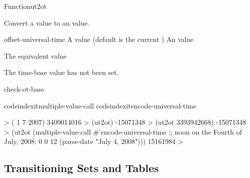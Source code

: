 \documentclass[10pt,twoside,english,pdftex]{article}
\begin{document}
\begin{functiondoc}{Function}{ut2ot}{%
    }
%

\fnsyntax

\fnpurpose Convert a  value to an  value.

\fnpackage {}

\fnmodule {}

\fnargs
\begin{args}{offset-universal-time}
 A  value (default is the current
   )
 An  value
\end{args}

\fnreturns The equivalent  value

\fnerrors The  time-base value has not been set.

\begin{alsos}{check-ot-base}
\also[*ot-base*]
\also[ot2ut]
\end{alsos}

\fnexamples
%
codeindexit{multiple-value-call}%
codeindexit{encode-universal-time}%
%
\W\supp
\begin{example}
  > ( 1 7 2007)
  3409014016
  > (ut2ot)
  -15071348
  > (ut2ot 3393942668)
  -15071348
  > (ut2ot (multiple-value-call #'encode-universal-time 
             ;; noon on the Fourth of July, 2008:
             0 0 12 (parse-date "July 4, 2008")))
  15161984
  >
\end{example}

\end{functiondoc}


\T\markright{}%
\T\pagestyle{plain}
\T\clearpage
\W{}
\T\pagestyle{fancy}
\T\thispagestyle{fancybottom}
\T\global\def\fnlastname{ }%

\subsection{Transitioning Sets and Tables}
\label{sec:atable}%
\end{document}
